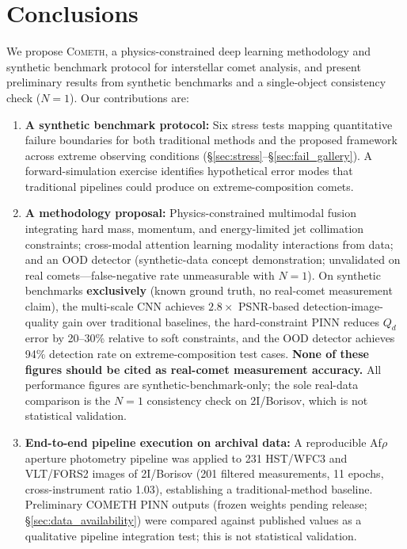 \documentclass[usenatbib]{mnras}
\begin{document}
\section{Conclusions}\label{sec:conclusions}

We propose \textsc{Cometh}, a physics-constrained deep learning methodology and synthetic benchmark protocol for interstellar comet analysis, and present preliminary results from synthetic benchmarks and a single-object consistency check ($N=1$). Our contributions are:

\begin{enumerate}
    \item \textbf{A synthetic benchmark protocol:} Six stress tests mapping quantitative failure boundaries for both traditional methods and the proposed framework across extreme observing conditions (\S\ref{sec:stress}--\S\ref{sec:fail_gallery}). A forward-simulation exercise identifies hypothetical error modes that traditional pipelines could produce on extreme-composition comets.
    \item \textbf{A methodology proposal:} Physics-constrained multimodal fusion integrating hard mass, momentum, and energy-limited jet collimation constraints; cross-modal attention learning modality interactions from data; and an OOD detector (synthetic-data concept demonstration; unvalidated on real comets---false-negative rate unmeasurable with $N=1$). On synthetic benchmarks \textbf{exclusively} (known ground truth, no real-comet measurement claim), the multi-scale CNN achieves $2.8\times$ PSNR-based detection-image-quality gain over traditional baselines, the hard-constraint PINN reduces $Q_d$ error by 20--30\% relative to soft constraints, and the OOD detector achieves 94\% detection rate on extreme-composition test cases. \textbf{None of these figures should be cited as real-comet measurement accuracy.} All performance figures are synthetic-benchmark-only; the sole real-data comparison is the $N=1$ consistency check on 2I/Borisov, which is not statistical validation.
    \item \textbf{End-to-end pipeline execution on archival data:} A reproducible Af$\rho$ aperture photometry pipeline was applied to 231 HST/WFC3 and VLT/FORS2 images of 2I/Borisov (201 filtered measurements, 11 epochs, cross-instrument ratio 1.03), establishing a traditional-method baseline. Preliminary COMETH PINN outputs (frozen weights pending release; \S\ref{sec:data_availability}) were compared against published values as a qualitative pipeline integration test; this is not statistical validation.

\end{enumerate}
\end{document}
